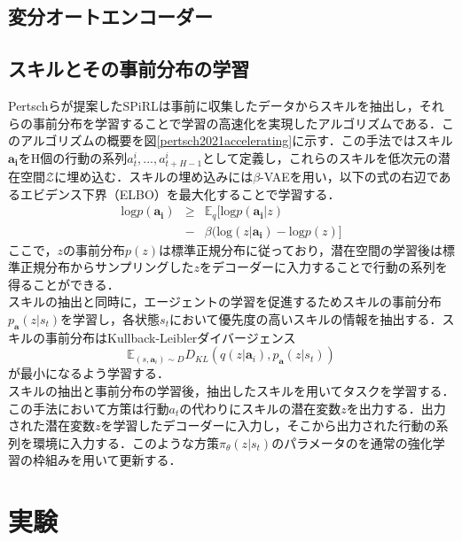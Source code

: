 \documentclass[dvipdfmx]{ampbt_nomag}
\begin{document}
\subsection{変分オートエンコーダー}


\subsection{スキルとその事前分布の学習}
Pertschらが提案したSPiRLは事前に収集したデータからスキルを抽出し，それらの事前分布を学習することで学習の高速化を実現したアルゴリズムである\cite{pertsch2021accelerating}．このアルゴリズムの概要を図\ref{pertsch2021accelerating}に示す．この手法ではスキル$\boldsymbol{a_i}$をH個の行動の系列$a^i_t,...,a^i_{t+H-1}$として定義し，これらのスキルを低次元の潜在空間$\mathcal{Z}$に埋め込む．スキルの埋め込みには$\beta$-VAEを用い，以下の式の右辺であるエビデンス下界（ELBO）を最大化することで学習する．
\begin{eqnarray} 
\label{ELBO}
\text{log} p(\boldsymbol{a_i}) &\geq& \mathbb{E}_q [\text{log} p(\boldsymbol{a_i}|z)  \\ \nonumber
&-&\beta(\text{log}(z|\boldsymbol{a_i}) - \text{log}p(z)]
\end{eqnarray}
ここで，$z$の事前分布$p(z)$は標準正規分布に従っており，潜在空間の学習後は標準正規分布からサンプリングした$z$をデコーダーに入力することで行動の系列を得ることができる．\\
スキルの抽出と同時に，エージェントの学習を促進するためスキルの事前分布$p_{\boldsymbol{a}}(z|s_t)$を学習し，各状態$s_t$において優先度の高いスキルの情報を抽出する．スキルの事前分布はKullback-Leiblerダイバージェンス
\begin{equation}
    \mathbb{E}_{(s,\boldsymbol{a}_i)\sim D}D_{KL}\left(q(z|\boldsymbol{a}_i),p_{\boldsymbol{a}}(z|s_t)\right)
\end{equation}
が最小になるよう学習する．\\
スキルの抽出と事前分布の学習後，抽出したスキルを用いてタスクを学習する．この手法において方策は行動$a_t$の代わりにスキルの潜在変数$z$を出力する．出力された潜在変数$z$を学習したデコーダーに入力し，そこから出力された行動の系列を環境に入力する．このような方策$\pi_\theta(z|s_t)$のパラメータのを通常の強化学習の枠組みを用いて更新する．


\section{実験}\label{sec-experiment}
\end{document}
